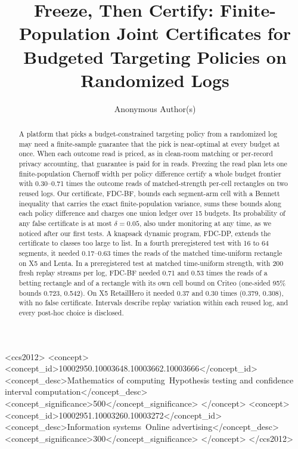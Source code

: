 \documentclass[sigconf,anonymous,review]{acmart}
\begin{document}
\title{Freeze, Then Certify: Finite-Population Joint Certificates for Budgeted Targeting Policies on Randomized Logs}

\author{Anonymous Author(s)}

\begin{abstract}
A platform that picks a budget-constrained targeting policy from a randomized log may need a finite-sample guarantee that the pick is near-optimal at every budget at once. When each outcome read is priced, as in clean-room matching or per-record privacy accounting, that guarantee is paid for in reads. Freezing the read plan lets one finite-population Chernoff width per policy difference certify a whole budget frontier with 0.30--0.71 times the outcome reads of matched-strength per-cell rectangles on two reused logs. Our certificate, FDC-BF, bounds each segment-arm cell with a Bennett inequality that carries the exact finite-population variance, sums these bounds along each policy difference and charges one union ledger over 15 budgets. Its probability of any false certificate is at most $\delta = 0.05$, also under monitoring at any time, as we noticed after our first tests. A knapsack dynamic program, FDC-DP, extends the certificate to classes too large to list. In a fourth preregistered test with 16 to 64 segments, it needed 0.17--0.63 times the reads of the matched time-uniform rectangle on X5 and Lenta. In a preregistered test at matched time-uniform strength, with 200 fresh replay streams per log, FDC-BF needed 0.71 and 0.53 times the reads of a betting rectangle and of a rectangle with its own cell bound on Criteo (one-sided 95\% bounds 0.723, 0.542). On X5 RetailHero it needed 0.37 and 0.30 times (0.379, 0.308), with no false certificate. Intervals describe replay variation within each reused log, and every post-hoc choice is disclosed.
\end{abstract}

\begin{CCSXML}
<ccs2012>
 <concept>
  <concept_id>10002950.10003648.10003662.10003666</concept_id>
  <concept_desc>Mathematics of computing~Hypothesis testing and confidence interval computation</concept_desc>
  <concept_significance>500</concept_significance>
 </concept>
 <concept>
  <concept_id>10002951.10003260.10003272</concept_id>
  <concept_desc>Information systems~Online advertising</concept_desc>
  <concept_significance>300</concept_significance>
 </concept>
</ccs2012>
\end{CCSXML}
\end{document}
